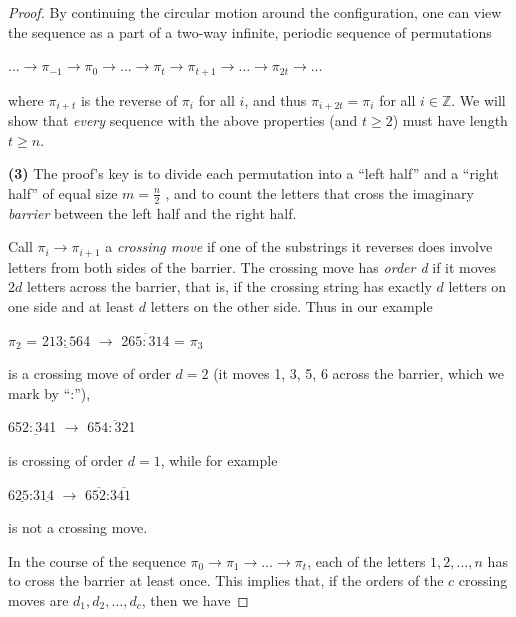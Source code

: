 \documentclass[a4paper]{article}
\begin{document}
\begin{proof}
\noindent
By continuing the circular motion around the configuration, one can view the sequence as a part of a two-way infinite, periodic sequence of permutations

\begin{center}
$ \ldots \rightarrow \pi_{-1}  \rightarrow \pi_0 \rightarrow \ldots \rightarrow \pi_t \rightarrow \pi_{t+1} \rightarrow \ldots \rightarrow \pi_{2t} \rightarrow \ldots $
\end{center}

\noindent
where $\pi_{i+t}$ is the reverse of $\pi_i$ for all $i$, and thus $\pi_{i+2t} = \pi_i$ for all $i \in \mathbb{Z}$. We will show that \textit{every} sequence with the above properties (and $t \geq 2$) must have length $t \geq n$.

\noindent
\textbf{(3)} The proof’s key is to divide each permutation into a “left half” and a “right half” of equal size $m = \frac{n}{2}$ , and to count the letters that cross the imaginary \textit{barrier} between the left half and the right half. 

\noindent
Call  $\pi_i \rightarrow \pi_{i+1}$  a \textit{crossing move} if one of the substrings it reverses does involve letters from both sides of the barrier. The crossing move has \textit{order d} if it moves $2d$ letters across the barrier, that is, if the crossing string has exactly $d$ letters on one side and at least $d$ letters on the other side. Thus in our example

\begin{center}
$\pi_2$ = 2\(\underline{13:56}\)4 $\longrightarrow$ 2\(\overline{65:31}\)4 = $\pi_3$ 
\end{center}

\noindent
is a crossing move of order $d = 2$ (it moves 1, 3, 5, 6 across the barrier, which we mark by “:”), 

\begin{center}
65\(\underline{2:34}\)1 $\longrightarrow$ 65\(\overline{4:32}\)1
\end{center}

\noindent
is crossing of order $d = 1$, while for example 

\begin{center}
6\(\underline{25}\):3\(\underline{14}\) $\longrightarrow$ 6\(\overline{52}\):3\(\overline{41}\)
\end{center}

\noindent
is not a crossing move.

\noindent
In the course of the sequence $\pi_0 \rightarrow \pi_1 \rightarrow \ldots \rightarrow \pi_t$, each of the letters $1, 2,\ldots,n$ has to cross the barrier at least once. This implies that, if the orders of the $c$ crossing moves are $d_1, d_2, \ldots, d_c$, then we have


\end{proof}
\end{document}
